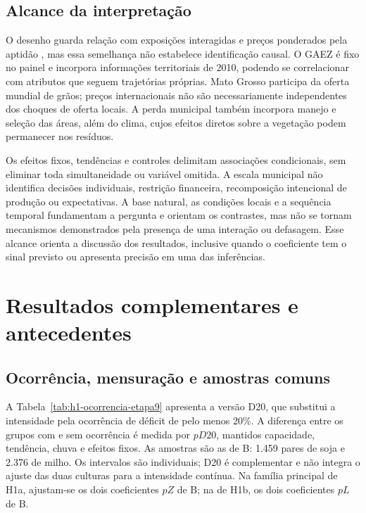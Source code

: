 \subsection{Alcance da interpretação}
\label{estrategia-limites}

O desenho guarda relação com exposições interagidas e preços ponderados pela aptidão \cite{GoldsmithPinkhamEtAl2020,BermanEtAl2023}, mas essa semelhança não estabelece identificação causal. O GAEZ é fixo no painel e incorpora informações territoriais de 2010, podendo se correlacionar com atributos que seguem trajetórias próprias. Mato Grosso participa da oferta mundial de grãos; preços internacionais não são necessariamente independentes dos choques de oferta locais. A perda municipal também incorpora manejo e seleção das áreas, além do clima, cujos efeitos diretos sobre a vegetação podem permanecer nos resíduos.

Os efeitos fixos, tendências e controles delimitam associações condicionais, sem eliminar toda simultaneidade ou variável omitida. A escala municipal não identifica decisões individuais, restrição financeira, recomposição intencional de produção ou expectativas. A base natural, as condições locais e a sequência temporal fundamentam a pergunta e orientam os contrastes, mas não se tornam mecanismos demonstrados pela presença de uma interação ou defasagem. Esse alcance orienta a discussão dos resultados, inclusive quando o coeficiente tem o sinal previsto ou apresenta precisão em uma das inferências.


\section{Resultados complementares e antecedentes}
\label{text:s5}
\label{ap:complementos}
\subsection{Ocorrência, mensuração e amostras comuns}

A Tabela~\ref{tab:h1-ocorrencia-etapa9} apresenta a versão D20, que substitui a intensidade pela ocorrência de déficit de pelo menos 20\%. A diferença entre os grupos com e sem ocorrência é medida por $pD20$, mantidos capacidade, tendência, chuva e efeitos fixos. As amostras são as de B: 1.459 pares de soja e 2.376 de milho. Os intervalos são individuais; D20 é complementar e não integra o ajuste das duas culturas para a intensidade contínua. Na família principal de H1a, ajustam-se os dois coeficientes $pZ$ de B; na de H1b, os dois coeficientes $pL$ de B.

